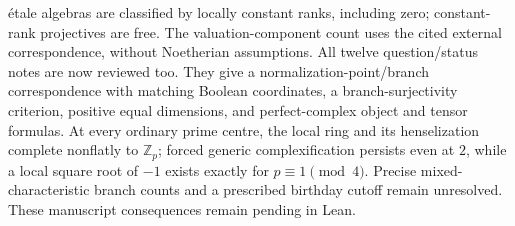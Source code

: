 \documentclass[11pt]{article}
\newcommand{\Z}{\mathbb{Z}}
\begin{document}
{\'etale algebras are classified by locally constant ranks, including zero;
constant-rank projectives are free. The valuation-component count uses
the cited external correspondence, without Noetherian assumptions.
All twelve question/status notes are now reviewed too. They give a
normalization-point/branch correspondence with matching Boolean coordinates,
a branch-surjectivity criterion, positive equal dimensions, and
perfect-complex object and tensor formulas. At every ordinary prime centre,
the local ring and its henselization complete nonflatly to $\Z_p$;
forced generic complexification persists even at $2$, while a local square
root of $-1$ exists exactly for $p\equiv1\pmod4$. Precise mixed-characteristic
branch counts and a prescribed birthday cutoff remain unresolved.
These manuscript consequences remain pending in Lean.}
\end{document}
